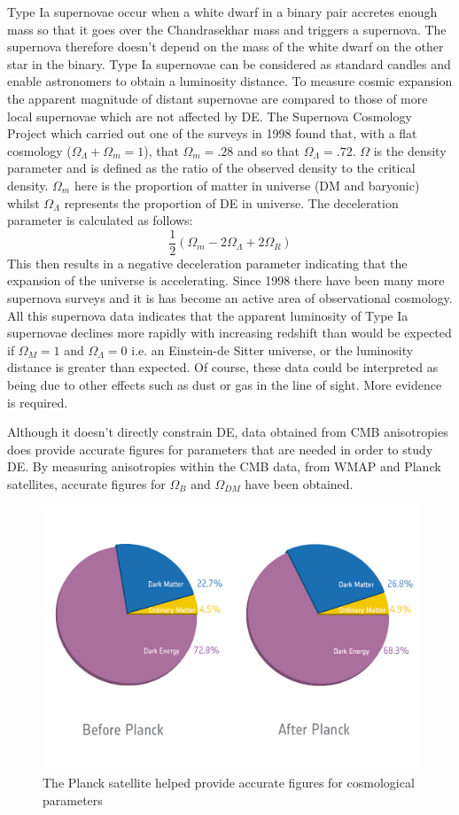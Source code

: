 \documentclass[a4paper,12pt]{article}
\begin{document}
Type Ia supernovae occur when a white dwarf in a binary pair accretes enough mass so that it goes over the Chandrasekhar mass and triggers a supernova. The supernova therefore doesn't
depend on the mass of the white dwarf on the other star in the binary. Type Ia supernovae can be considered as standard candles and enable astronomers to obtain a luminosity distance.
To measure cosmic expansion the apparent magnitude of distant supernovae are compared to those of more local supernovae which are not affected by DE. The Supernova Cosmology Project
which carried out one of the surveys in 1998 found that, with a flat cosmology ($\Omega_{\Lambda}+\Omega_m=1$), that $\Omega_m=.28$ and so that $\Omega_{\Lambda}=.72$. $\Omega$ is the
density parameter and is defined as the ratio of the observed density to the critical density. $\Omega_m$ here is 
the proportion of matter in universe (DM and baryonic) whilst $\Omega_{\Lambda}$ represents the proportion of DE in universe. The deceleration parameter is calculated as follows:
\begin{equation}
\frac{1}{2}(\Omega_m-2\Omega_{\Lambda}+2\Omega_R) 
\end{equation}
This then results in a negative deceleration parameter indicating that the expansion of the universe is accelerating.
Since 1998 there have been many more supernova surveys and it is has become an active area of observational cosmology. All this supernova data indicates that the apparent luminosity
of Type Ia supernovae declines more rapidly with increasing redshift than would be expected if $\Omega_M=1$ and $\Omega_{\Lambda}=0$ i.e. an Einstein-de Sitter universe, or the 
luminosity distance is greater than expected. Of course, these data could be interpreted as being due to other effects such as dust or gas in the line of sight. More evidence is required.

Although it doesn't directly constrain DE, data obtained from CMB anisotropies does provide accurate figures for parameters that are needed in order to study DE. By measuring anisotropies 
within the CMB data, from WMAP and Planck satellites, accurate figures for $\Omega_B$ and $\Omega_{DM}$ have been obtained. 
\begin{figure}[H]
\centering
\includegraphics[width=.9\textwidth]{./planck2.jpg}
\caption{The Planck satellite helped provide accurate figures for cosmological parameters \citep{planck}}
\label{fig:3}
\end{figure}
\end{document}
